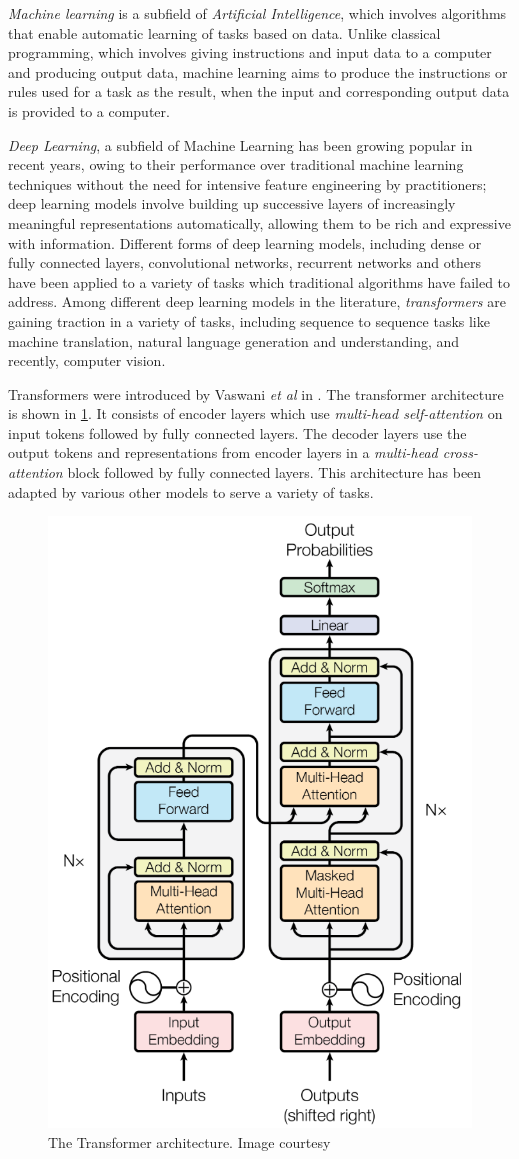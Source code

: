 
\par \textit{Machine learning} is a subfield of \textit{Artificial Intelligence}, which involves algorithms that enable automatic learning of tasks based on data. Unlike classical programming, which involves giving instructions and input data to a computer and producing output data, machine learning aims to produce the instructions or rules used for a task as the result, when the input and corresponding output data is provided to a computer.

\par \textit{Deep Learning}, a subfield of Machine Learning has been growing popular in recent years, owing to their performance over traditional machine learning techniques without the need for intensive feature engineering by practitioners; deep learning models involve building up successive layers of increasingly meaningful representations automatically, allowing them to be rich and expressive with information. Different forms of deep learning models, including dense or fully connected layers, convolutional networks, recurrent networks and others have been applied to a variety of tasks which traditional algorithms have failed to address. Among different deep learning models in the literature, \textit{transformers} are gaining traction in a variety of tasks, including sequence to sequence tasks like machine translation, natural language generation and understanding, and recently, computer vision.

\par Transformers were introduced by Vaswani \textit{et al} in \cite{tfm}. The transformer architecture is shown in \ref{fig:transformer}. It consists of encoder layers which use \textit{multi-head self-attention} on input tokens followed by fully connected layers. The decoder layers use the output tokens and representations from encoder layers in a \textit{multi-head cross-attention} block followed by fully connected layers. This architecture has been adapted by various other models to serve a variety of tasks.

\begin{figure}[h]
\centering
\includegraphics[width=0.5\linewidth]{assets/img/transformer.png}
\caption{The Transformer architecture. Image courtesy \cite{tfm}}
\label{fig:transformer}
\end{figure}